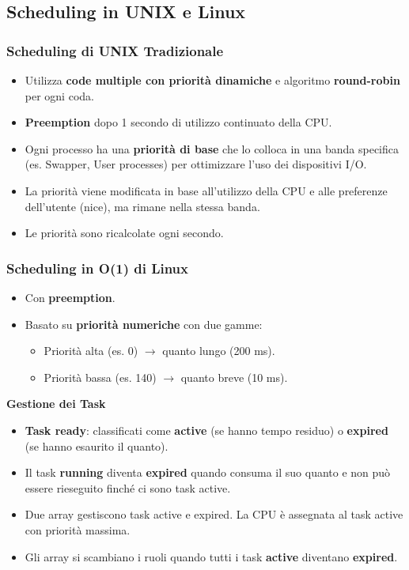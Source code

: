 \documentclass{article}
\begin{document}
\subsection{Scheduling in UNIX e Linux}
\subsubsection{Scheduling di UNIX Tradizionale}
\begin{itemize}
    \item Utilizza \textbf{code multiple con priorità dinamiche} e algoritmo \textbf{round-robin} per ogni coda.
    \item \textbf{Preemption} dopo 1 secondo di utilizzo continuato della CPU.
    \item Ogni processo ha una \textbf{priorità di base} che lo colloca in una banda specifica (es. Swapper, User processes) per ottimizzare l’uso dei dispositivi I/O.
    \item La priorità viene modificata in base all’utilizzo della CPU e alle preferenze dell’utente (nice), ma rimane nella stessa banda.
    \item Le priorità sono ricalcolate ogni secondo.
\end{itemize}
\subsubsection{Scheduling in O(1) di Linux}
\begin{itemize}
    \item Con \textbf{preemption}.
    \item Basato su \textbf{priorità numeriche} con due gamme:
        \begin{itemize}
            \item Priorità alta (es. 0) $\rightarrow$ quanto lungo (200 ms).
            \item Priorità bassa (es. 140) $\rightarrow$ quanto breve (10 ms).
        \end{itemize}
\end{itemize}
\textbf{Gestione dei Task}
\begin{itemize}
    \item \textbf{Task ready}: classificati come \textbf{active} (se hanno tempo residuo) o \textbf{expired} (se hanno esaurito il quanto).
    \item Il task \textbf{running} diventa \textbf{expired} quando consuma il suo quanto e non può essere rieseguito finché ci sono task active.
    \item Due array gestiscono task active e expired. La CPU è assegnata al task active con priorità massima.
    \item Gli array si scambiano i ruoli quando tutti i task \textbf{active} diventano \textbf{expired}.
\end{itemize}
\end{document}

